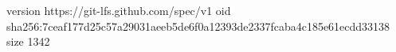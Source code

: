 version https://git-lfs.github.com/spec/v1
oid sha256:7ceaf177d25c57a29031aeeb5de6f0a12393de2337fcaba4c185e61ecdd33138
size 1342
